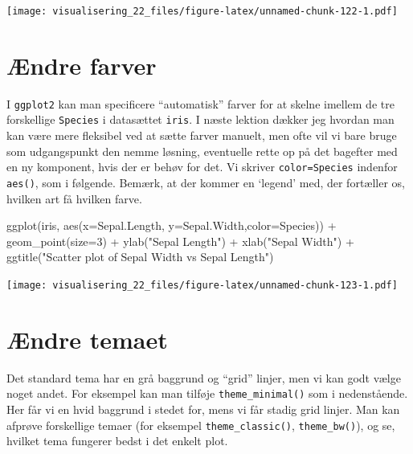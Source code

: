 \documentclass[
]{book}
\newenvironment{Shaded}{\begin{snugshade}}{\end{snugshade}}
\newcommand{\AttributeTok}[1]{\textcolor[rgb]{0.77,0.63,0.00}{#1}}
\newcommand{\DecValTok}[1]{\textcolor[rgb]{0.00,0.00,0.81}{#1}}
\newcommand{\FunctionTok}[1]{\textcolor[rgb]{0.00,0.00,0.00}{#1}}
\newcommand{\NormalTok}[1]{#1}
\newcommand{\SpecialCharTok}[1]{\textcolor[rgb]{0.00,0.00,0.00}{#1}}
\newcommand{\StringTok}[1]{\textcolor[rgb]{0.31,0.60,0.02}{#1}}
\begin{document}
\texttt{[image: visualisering\_22\_files/figure-latex/unnamed-chunk-122-1.pdf]}

\hypertarget{uxe6ndre-farver}{%
\section{Ændre farver}\label{uxe6ndre-farver}}

I \texttt{ggplot2} kan man specificere ``automatisk'' farver for at skelne imellem de tre forskellige \texttt{Species} i datasættet \texttt{iris}. I næste lektion dækker jeg hvordan man kan være mere fleksibel ved at sætte farver manuelt, men ofte vil vi bare bruge som udgangspunkt den nemme løsning, eventuelle rette op på det bagefter med en ny komponent, hvis der er behøv for det. Vi skriver \texttt{color=Species} indenfor \texttt{aes()}, som i følgende. Bemærk, at der kommer en `legend' med, der fortæller os, hvilken art få hvilken farve.

\begin{Shaded}
\begin{Highlighting}[]
\FunctionTok{ggplot}\NormalTok{(iris, }\FunctionTok{aes}\NormalTok{(}\AttributeTok{x=}\NormalTok{Sepal.Length, }\AttributeTok{y=}\NormalTok{Sepal.Width,}\AttributeTok{color=}\NormalTok{Species)) }\SpecialCharTok{+}
  \FunctionTok{geom\_point}\NormalTok{(}\AttributeTok{size=}\DecValTok{3}\NormalTok{) }\SpecialCharTok{+}
  \FunctionTok{ylab}\NormalTok{(}\StringTok{"Sepal Length"}\NormalTok{) }\SpecialCharTok{+}
  \FunctionTok{xlab}\NormalTok{(}\StringTok{"Sepal Width"}\NormalTok{) }\SpecialCharTok{+}
  \FunctionTok{ggtitle}\NormalTok{(}\StringTok{"Scatter plot of Sepal Width vs Sepal Length"}\NormalTok{)}
\end{Highlighting}
\end{Shaded}

\texttt{[image: visualisering\_22\_files/figure-latex/unnamed-chunk-123-1.pdf]}

\hypertarget{uxe6ndre-temaet}{%
\section{Ændre temaet}\label{uxe6ndre-temaet}}

Det standard tema har en grå baggrund og ``grid'' linjer, men vi kan godt vælge noget andet. For eksempel kan man tilføje \texttt{theme\_minimal()} som i nedenstående. Her får vi en hvid baggrund i stedet for, mens vi får stadig grid linjer. Man kan afprøve forskellige temaer (for eksempel \texttt{theme\_classic()}, \texttt{theme\_bw()}), og se, hvilket tema fungerer bedst i det enkelt plot.
\end{document}
